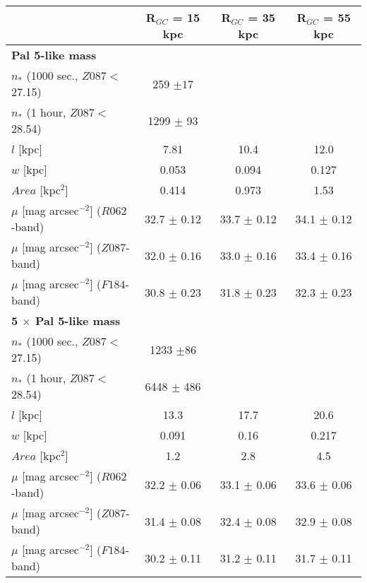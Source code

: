\documentclass[twocolumn]{aastex62}
\begin{document}
\begin{table*}
\centering
\caption{Properties of mock-streams in an M31-like halo\footnote{$n_*$ denotes the number of stars, $l$: the length, $w$: the width, $Area$: the area, $\mu$: the surface brightness of each mock-stream.}}
\label{tab:Pal5}
\begin{tabular}{lccc}
\hline
 & {\bf R$_{GC}$ = 15 kpc }&  {\bf R$_{GC}$ = 35 kpc} &  {\bf R$_{GC}$ = 55 kpc} \\ 
 \hline
{\bf Pal 5-like mass} & &&\\
$n_*$ (1000 sec.,  $Z087 <$ 27.15) & 259 $\pm 17$ & \\
$n_*$ (1 hour, $Z087 <$ 28.54) &1299 $\pm$ 93& \\
$l$ [kpc] & 7.81 & 10.4 &  12.0  \\
$w$ [kpc] & 0.053 & 0.094  & 0.127  \\
$Area$ [kpc$^2$] & 0.414 & 0.973 &1.53 \\
$\mu$ [mag arcsec$^{-2}$] ($R062$-band) &32.7 $\pm$ 0.12 &33.7 $\pm$ 0.12 &34.1 $\pm$ 0.12\\
$\mu$ [mag arcsec$^{-2}$] ($Z087$-band) &32.0 $\pm$ 0.16 &33.0 $\pm$ 0.16 &33.4 $\pm$ 0.16 \\
$\mu$ [mag arcsec$^{-2}$] ($F184$-band) &30.8 $\pm$ 0.23 &31.8 $\pm$ 0.23&32.3 $\pm$ 0.23\\

\hline
{\bf 5 $\times$ Pal 5-like mass} & &&\\ 
$n_*$ (1000 sec., $Z087 <$ 27.15) &1233 $\pm 86$ & \\
$n_*$ (1 hour, $Z087 <$ 28.54) &6448 $\pm$ 486& \\
$l$ [kpc] &13.3 & 17.7&20.6  \\
$w$ [kpc]& 0.091 &  0.16& 0.217  \\
$Area$ [kpc$^2$] & 1.2  &  2.8  &  4.5\\
$\mu$ [mag arcsec$^{-2}$] ($R062$-band) & 32.2 $\pm$ 0.06 &33.1 $\pm$ 0.06 &33.6 $\pm$ 0.06\\
$\mu$ [mag arcsec$^{-2}$] ($Z087$-band) & 31.4 $\pm$ 0.08 &  32.4 $\pm$ 0.08& 32.9 $\pm$ 0.08 \\
$\mu$ [mag arcsec$^{-2}$] ($F184$-band) &30.2 $\pm$ 0.11 &31.2 $\pm$ 0.11 &31.7 $\pm$ 0.11 \\


\end{tabular}
\end{table*}
\end{document}
